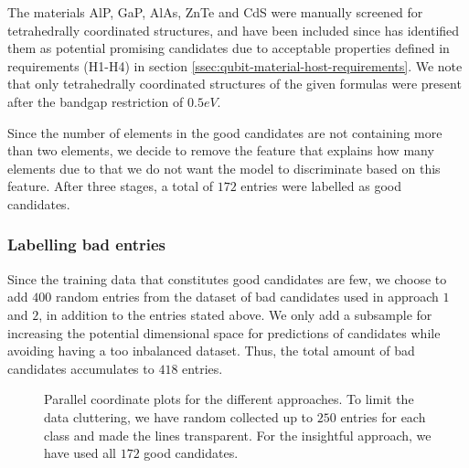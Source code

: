 The materials AlP, GaP, AlAs, ZnTe and CdS were manually screened for tetrahedrally coordinated structures, and have been included since \citeauthor{Weber2010} \cite{Weber2010} has identified them as potential promising candidates due to acceptable properties defined in requirements (H1-H4) in section \ref{ssec:qubit-material-host-requirements}. We note that only tetrahedrally coordinated structures of the given formulas were present after the bandgap restriction of $0.5eV$.

Since the number of elements in the good candidates are not containing more than two elements, we decide to remove the feature that explains how many elements due to that we do not want the model to discriminate based on this feature. After three stages, a total of $172$ entries were labelled as good candidates.

\subsubsection{Labelling bad entries}

Since the training data that constitutes good candidates are few, we choose to add $400$ random entries from the dataset of bad candidates used in approach $1$ and $2$, in addition to the entries stated above. We only add a subsample for increasing the potential dimensional space for predictions of candidates while avoiding having a too inbalanced dataset. Thus, the total amount of bad candidates accumulates to $418$ entries.

\clearpage

\begin{figure}[ht!]
    \centering
    \begin{subfigure}{1\textwidth}
        \centering
          
    \end{subfigure}
    \begin{subfigure}{1\textwidth}
        \centering
          
    \end{subfigure}
    \begin{subfigure}{1\textwidth}
        \centering
          
    \end{subfigure}
    \vspace*{-95mm}
    \caption{Parallel coordinate plots for the different approaches. To limit the data cluttering, we have random collected up to $250$ entries for each class and made the lines transparent. For the insightful approach, we have used all $172$ good candidates.}
    \label{fig:parallel-coordinates-approaches}
\end{figure}

